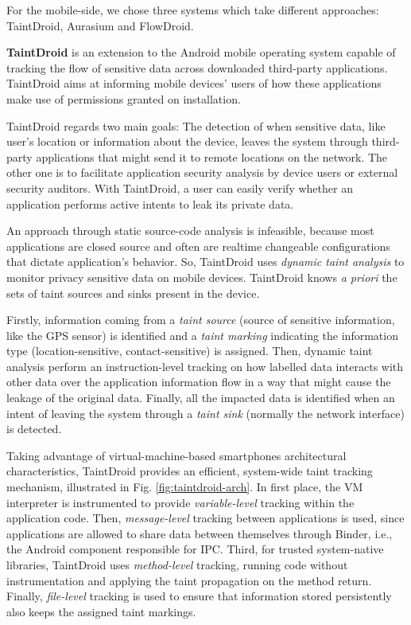 For the mobile-side, we chose three systems which take different approaches: TaintDroid, Aurasium and FlowDroid.

\textbf{TaintDroid} is an extension to the Android mobile operating system capable of tracking the flow of sensitive data across downloaded third-party applications. TaintDroid aims at informing mobile devices' users of how these applications make use of permissions granted on installation.

TaintDroid regards two main goals: The detection of when sensitive data, like user's location or information about the device, leaves the system through third-party applications that might send it to remote locations on the network. The other one is to facilitate application security analysis by device users or external security auditors. With TaintDroid, a user can easily verify whether an application performs active intents to leak its private data.

An approach through static source-code analysis is infeasible, because most applications are closed source and often are realtime changeable configurations that dictate application's behavior. So, TaintDroid uses \textit{dynamic taint analysis} to monitor privacy sensitive data on mobile devices. TaintDroid knows \textit{a priori} the sets of taint sources and sinks present in the device.

Firstly, information coming from a \textit{taint source} (source of sensitive information, like the GPS sensor) is identified and a \textit{taint marking} indicating the information type (location-sensitive, contact-sensitive) is assigned. Then, dynamic taint analysis perform an instruction-level tracking on how labelled data interacts with other data over the application information flow in a way that might cause the leakage of the original data. Finally, all the impacted data is identified when an intent of leaving the system through a \textit{taint sink} (normally the network interface) is detected.

Taking advantage of virtual-machine-based smartphones architectural characteristics, TaintDroid provides an efficient, system-wide taint tracking mechanism, illustrated in Fig. \ref{fig:taintdroid-arch}. In first place, the VM interpreter is instrumented to provide \textit{variable-level} tracking within the application code. Then, \textit{message-level} tracking between applications is used, since applications are allowed to share data between themselves through Binder, i.e., the Android component responsible for IPC. Third, for trusted system-native libraries, TaintDroid uses \textit{method-level} tracking, running code without instrumentation and applying the taint propagation on the method return. Finally, \textit{file-level} tracking is used to ensure that information stored persistently also keeps the assigned taint markings.

